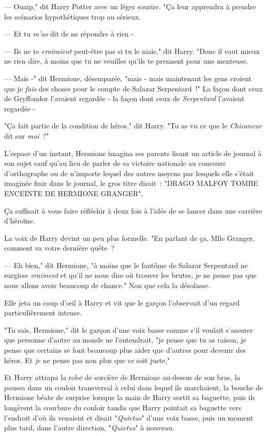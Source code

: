 --- Ouaip," dit Harry Potter avec un léger sourire. "Ça leur apprendra à prendre les scénarios hypothétiques trop au sérieux.

--- Et tu \emph{m'as} dit de ne répondre à rien -

--- Ils ne te \emph{croiraient} peut-être pas si tu le niais," dit Harry. "Donc il vaut mieux ne rien dire, à moins que tu ne veuilles qu'ils te prennent pour une menteuse.

--- Mais -" dit Hermione, désemparée, "mais - mais maintenant les gens croient que je \emph{fais} des choses pour le compte de Salazar Serpentard~!" La façon dont ceux de Gryffondor l'avaient regardée - la façon dont ceux de \emph{Serpentard} l'avaient regardée -

"Ça fait partie de la condition de héros," dit Harry. "Tu as vu ce que le \emph{Chicaneur} dit sur \emph{moi}~?"

L'espace d'un instant, Hermione imagina ses parents lisant un article de journal à son sujet sauf qu'au lieu de parler de sa victoire nationale au concours d'orthographe ou de n'importe lequel des autres moyens par lesquels elle s'était imaginée finir dans le journal, le gros titre disait~: "DRAGO MALFOY TOMBE ENCEINTE DE HERMIONE GRANGER".

Ça suffisait à vous faire réfléchir à deux fois à l'idée de se lancer dans une carrière d'héroïne.

La voix de Harry devint un peu plus formelle. "En parlant de ça, Mlle Granger, comment va votre dernière quête~?

--- Eh bien," dit Hermione, "à moins que le fantôme de Salazar Serpentard ne surgisse \emph{vraiment} et qu'il ne nous dise où trouver les brutes, je ne pense pas que nous allons avoir beaucoup de chance." Non que cela la désolasse.

Elle jeta un coup d'œil à Harry et vit que le garçon l'observait d'un regard particulièrement intense.

"Tu sais, Hermione," dit le garçon d'une voix basse comme s'il voulait s'assurer que personne d'autre au monde ne l'entendrait, "je pense que tu as raison, je pense que certains se font beaucoup plus aider que d'autres pour devenir des héros. Et \emph{je} ne pense pas non plus que ce soit juste."

Et Harry attrapa la robe de sorcière de Hermione au-dessus de son bras, la poussa dans un couloir transversal à celui dans lequel ils marchaient, la bouche de Hermione béate de surprise lorsque la main de Harry sortit sa baguette, puis ils longèrent la courbure du couloir tandis que Harry pointait sa baguette vers l'endroit d'où ils venaient et disait "\emph{Quietus}" d'une voix basse, puis un moment plus tard, dans l'autre direction, "\emph{Quietus}" à nouveau.

